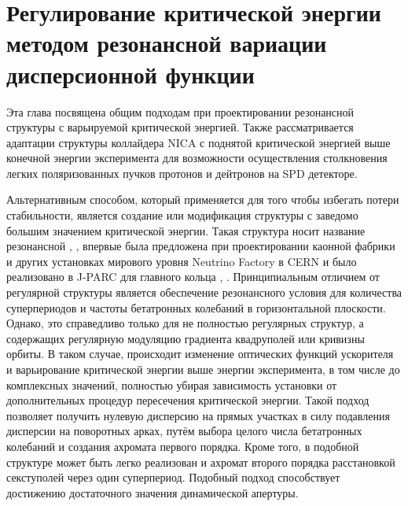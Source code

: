 
	\chapter{Регулирование критической энергии методом резонансной вариации дисперсионной функции}\label{ch:resonant}

\par Эта глава посвящена общим подходам при проектировании резонансной структуры с варьируемой критической энергией. Также рассматривается адаптации структуры коллайдера NICA с поднятой критической энергией выше конечной энергии эксперимента для возможности осуществления столкновения легких поляризованных пучков протонов и дейтронов на SPD детекторе.

\par	Альтернативным способом, который применяется для того чтобы избегать потери стабильности, является создание или модификация структуры с заведомо большим значением критической энергии. Такая структура носит название резонансной \cite{senichev:resonant}, \cite{senichev:construction}, впервые была предложена при проектировании каонной фабрики \cite{kaon_tr} и других установках мирового уровня Neutrino Factory в CERN \cite{neutrino_tr} и было реализовано в J-PARC для главного кольца \cite{JHP_tr}, \cite{J-PARK_tr}. Принципиальным отличием от регулярной структуры является обеспечение резонансного условия для количества суперпериодов и частоты бетатронных колебаний в горизонтальной плоскости. Однако, это справедливо только для не полностью регулярных структур, а содержащих регулярную модуляцию градиента квадруполей или кривизны орбиты. В таком случае, происходит изменение оптических функций ускорителя и варьирование критической энергии выше энергии эксперимента, в том числе до комплексных значений, полностью убирая зависимость установки от дополнительных процедур пересечения критической энергии. Такой подход позволяет получить нулевую дисперсию на прямых участках в силу подавления дисперсии на поворотных арках, путём выбора целого числа бетатронных колебаний и создания ахромата первого порядка. Кроме того, в подобной структуре может быть легко реализован и ахромат второго порядка расстановкой секступолей через один суперпериод. Подобный подход способствует достижению достаточного значения динамической апертуры.

\begin{comment}
В эксперименте по столкновению тяжелых ионов золота c максимальной энергией $E_{exp}=4.5$ ГэВ/нуклон критическая энергия магнитооптической структуры коллайдера составляет $E_{tr}^{Au-Au}=5.7$\ ГэВ ($\gamma_{tr}^{Au-Au}=7.1$). Такое значение критической энергии было достигнуто выбором частоты бетатронных колебаний в горизонтальной плоскости $\nu_x\approx\gamma_{tr}^{Au}>\gamma_{max}^{Au}\approx7.1$, которая  при условии регулярности структуры арок, состоящих из одинаковых ячеек ФОДО, должна быть больше максимального значения фактора Лоренца во всем интервале энергий.
\end{comment}

